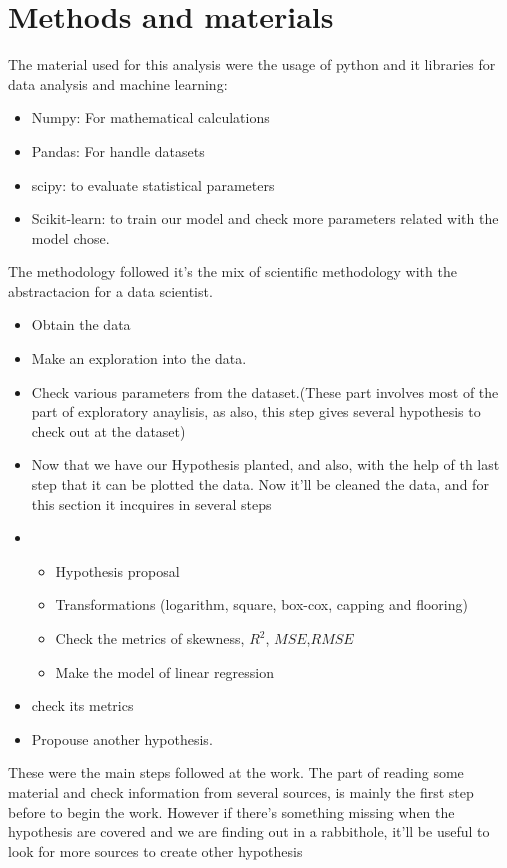 \documentclass{article}
\begin{document}
\section{Methods and materials}
The material used for this analysis were the usage of python and it libraries for data analysis and machine learning:
\begin{itemize}
  \item Numpy: For mathematical calculations
  \item Pandas: For handle datasets 
  \item scipy: to evaluate statistical parameters
  \item Scikit-learn: to train our model and check more parameters related with the model chose.  
\end{itemize}
The methodology followed it's the mix of scientific methodology with the abstractacion for a data scientist. 
\begin{itemize}
  \item Obtain the data
  \item Make an exploration into the data.
  \item Check various parameters from the dataset.(These part involves most of the part of exploratory anaylisis, as also, this step gives several hypothesis to check out at the dataset)
  \item Now that we have our Hypothesis planted, and also, with the help of th last step that it can be plotted the data. Now it'll be cleaned the data, and for this section it incquires in several steps
  \item \begin{itemize}
    \item Hypothesis proposal
    \item Transformations (logarithm, square, box-cox, capping and flooring)
    \item Check the metrics of skewness, $R^2$, $MSE$,$RMSE$ 
    \item Make the model of linear regression 
  \end{itemize}
  \item check its metrics
  \item Propouse another hypothesis.
\end{itemize}
These were the main steps followed at the work. The part of reading some material and check information from several sources, is mainly the first step before to begin the work. However if there's something missing when the hypothesis are covered and we are finding out in a rabbithole, it'll be useful to look for more sources to create other hypothesis
\end{document}
